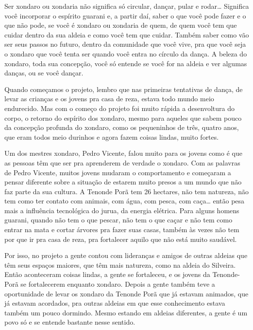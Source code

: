 Ser xondaro ou xondaria não significa só circular, dançar, pular e
rodar\ldots{} Significa você incorporar o espírito guarani e, a partir daí,
saber o que você pode fazer e o que não pode, se você é xondaro ou
xondaria de quem, de quem você tem que cuidar dentro da sua aldeia e
como você tem que cuidar. Também saber como vão ser seus passos no
futuro, dentro da comunidade que você vive, pra que você seja o xondaro
que você tenta ser quando você entra no círculo da dança. A beleza do
xondaro, toda sua concepção, você só entende se você for na aldeia e
ver algumas danças, ou se você dançar.

Quando começamos o projeto, lembro que nas primeiras tentativas de
dança, de levar as crianças e os jovens pra casa de reza, estava todo
mundo meio endurecido. Mas com o começo do projeto foi muito rápida a
desenvoltura do corpo, o retorno do espírito dos xondaro, mesmo para
aqueles que sabem pouco da concepção profunda do xondaro, como os
pequeninhos de três, quatro anos, que eram todos meio durinhos e agora
fazem coisas lindas, muito fortes. 

Um dos mestres xondaro, Pedro Vicente, falou muito para os jovens como é
que as pessoas têm que ser pra aprenderem de verdade o xondaro. Com as
palavras de Pedro Vicente, muitos jovens mudaram o comportamento e
começaram a pensar diferente sobre a situação de estarem muito presos a
um mundo que não faz parte da sua cultura. A Tenonde Porã tem 26
hectares, não tem natureza, não tem como ter contato com animais, com
água, com pesca, com caça\ldots{} então pesa mais a influência tecnológica
do jurua, da energia elétrica. Para alguns homens guarani, quando não
tem o que pescar, não tem o que caçar e não tem como entrar na mata e
cortar árvores pra fazer suas casas, também às vezes não tem por que ir
pra casa de reza, pra fortalecer aquilo que não está muito saudável.

Por isso, no projeto a gente contou com lideranças e amigos de outras
aldeias que têm seus espaços maiores, que têm mais natureza, como na
aldeia do Silveira. Então aconteceram coisas lindas, a gente se
fortaleceu, e os jovens da Tenonde-Porã se fortalecerem enquanto
xondaro. Depois a gente também teve a oportunidade de levar os xondaro
da Tenonde Porã que já estavam animados, que já estavam acordados, pra
outras aldeias em que esse conhecimento estava também um pouco
dormindo. Mesmo estando em aldeias diferentes, a gente é um povo só e
se entende bastante nesse sentido.

